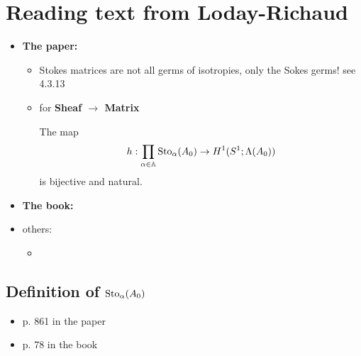 \section{Reading text from Loday-Richaud}
\begin{itemize}
  \item \textbf{The paper:}
    \cite{Loday1994}
    \begin{itemize}
      \item Stokes matrices are not all germs of isotropies, only the Sokes
        germs! see 4.3.13
      \item for \textbf{Sheaf $\to$ Matrix}
        \begin{thm}[II.2.1]
          The map
          \[
            h:\prod_{\alpha\in\mathbb{A}}\operatorname{Sto}_\alpha(A_0)\to H^1(S^1;\Lambda(A_0))
          \]
          is bijective and natural.
        \end{thm}
    \end{itemize}
  \item \textbf{The book:} \cite{lodayrichaud:hal-01011050}
  \item others:
    \begin{itemize}
      \item \cite{LodayRichaud2004}
    \end{itemize}
\end{itemize}

\subsection{Definition of $\operatorname{Sto}_\alpha(A_0)$}
\begin{itemize}
  \item p. 861 in the paper
  \item p. 78 in the book
\end{itemize}
